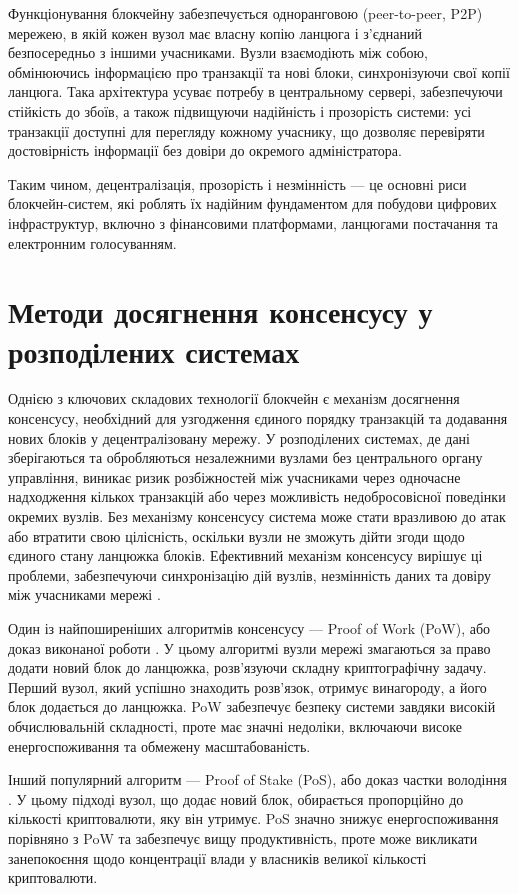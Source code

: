 \documentclass[14pt]{extreport}
\begin{document}
  Функціонування блокчейну забезпечується одноранговою (peer-to-peer, P2P) мережею, в якій кожен вузол має власну копію ланцюга і з'єднаний безпосередньо з іншими учасниками. Вузли взаємодіють між собою, обмінюючись інформацією про транзакції та нові блоки, синхронізуючи свої копії ланцюга. Така архітектура усуває потребу в центральному сервері, забезпечуючи стійкість до збоїв, а також підвищуючи надійність і прозорість системи: усі транзакції доступні для перегляду кожному учаснику, що дозволяє перевіряти достовірність інформації без довіри до окремого адміністратора.

  Таким чином, децентралізація, прозорість і незмінність — це основні риси блокчейн-систем, які роблять їх надійним фундаментом для побудови цифрових інфраструктур, включно з фінансовими платформами, ланцюгами постачання та електронним голосуванням.

  \section{Методи досягнення консенсусу у розподілених системах}

  Однією з ключових складових технології блокчейн є механізм досягнення консенсусу, необхідний для узгодження єдиного порядку транзакцій та додавання нових блоків у децентралізовану мережу. У розподілених системах, де дані зберігаються та обробляються незалежними вузлами без центрального органу управління, виникає ризик розбіжностей між учасниками через одночасне надходження кількох транзакцій або через можливість недобросовісної поведінки окремих вузлів. Без механізму консенсусу система може стати вразливою до атак або втратити свою цілісність, оскільки вузли не зможуть дійти згоди щодо єдиного стану ланцюжка блоків. Ефективний механізм консенсусу вирішує ці проблеми, забезпечуючи синхронізацію дій вузлів, незмінність даних та довіру між учасниками мережі \cite{consensus}.

  Один із найпоширеніших алгоритмів консенсусу — Proof of Work (PoW), або доказ виконаної роботи \cite{pow}. У цьому алгоритмі вузли мережі змагаються за право додати новий блок до ланцюжка, розв'язуючи складну криптографічну задачу. Перший вузол, який успішно знаходить розв'язок, отримує винагороду, а його блок додається до ланцюжка. PoW забезпечує безпеку системи завдяки високій обчислювальній складності, проте має значні недоліки, включаючи високе енергоспоживання та обмежену масштабованість.

  Інший популярний алгоритм — Proof of Stake (PoS), або доказ частки володіння \cite{pos}. У цьому підході вузол, що додає новий блок, обирається пропорційно до кількості криптовалюти, яку він утримує. PoS значно знижує енергоспоживання порівняно з PoW та забезпечує вищу продуктивність, проте може викликати занепокоєння щодо концентрації влади у власників великої кількості криптовалюти.
\end{document}
